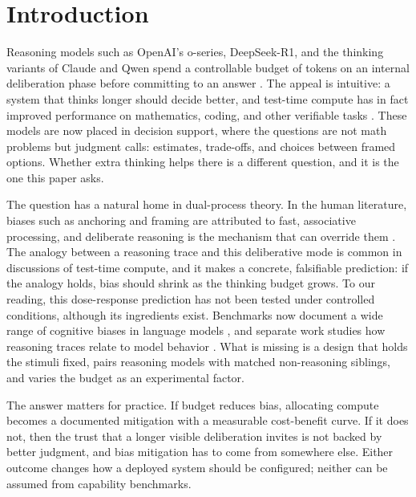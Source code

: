 \documentclass[conference]{IEEEtran}
\begin{document}
\section{Introduction}

Reasoning models such as OpenAI's o-series, DeepSeek-R1, and the thinking variants of Claude and Qwen spend a controllable budget of tokens on an internal deliberation phase before committing to an answer \cite{jaech2024openai, guo2025deepseek, yang2025qwen3}. The appeal is intuitive: a system that thinks longer should decide better, and test-time compute has in fact improved performance on mathematics, coding, and other verifiable tasks \cite{snell2024scaling, muennighoff2025s1}. These models are now placed in decision support, where the questions are not math problems but judgment calls: estimates, trade-offs, and choices between framed options. Whether extra thinking helps there is a different question, and it is the one this paper asks.

The question has a natural home in dual-process theory. In the human literature, biases such as anchoring and framing are attributed to fast, associative processing, and deliberate reasoning is the mechanism that can override them \cite{tversky1974judgment, evans2013dual}. The analogy between a reasoning trace and this deliberative mode is common in discussions of test-time compute, and it makes a concrete, falsifiable prediction: if the analogy holds, bias should shrink as the thinking budget grows. To our reading, this dose-response prediction has not been tested under controlled conditions, although its ingredients exist. Benchmarks now document a wide range of cognitive biases in language models \cite{malberg2024comprehensive, echterhoff2024cognitive, binz2023using}, and separate work studies how reasoning traces relate to model behavior \cite{turpin2023language, chen2025reasoning}. What is missing is a design that holds the stimuli fixed, pairs reasoning models with matched non-reasoning siblings, and varies the budget as an experimental factor.

The answer matters for practice. If budget reduces bias, allocating compute becomes a documented mitigation with a measurable cost-benefit curve. If it does not, then the trust that a longer visible deliberation invites is not backed by better judgment, and bias mitigation has to come from somewhere else. Either outcome changes how a deployed system should be configured; neither can be assumed from capability benchmarks.
\end{document}
